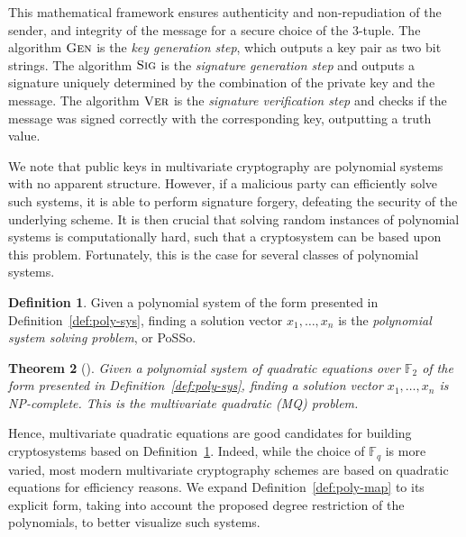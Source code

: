 \documentclass[12pt, a4paper, oneside]{memoir}
\newtheorem{theorem}{Theorem}[section]
\theoremstyle{definition}
\newtheorem{definition}[theorem]{Definition}
\begin{document}
This mathematical framework ensures authenticity and non-repudiation of the sender, and integrity of the message for a secure choice of the $3$-tuple. The algorithm $\textsc{Gen}$ is the \emph{key generation step}, which outputs a key pair as two bit strings. The algorithm $\textsc{Sig}$ is the \emph{signature generation step} and outputs a signature uniquely determined by the combination of the private key and the message. The algorithm $\textsc{Ver}$ is the \emph{signature verification step} and checks if the message was signed correctly with the corresponding key, outputting a truth value.

We note that public keys in multivariate cryptography are polynomial systems with no apparent structure. However, if a malicious party can efficiently solve such systems, it is able to perform signature forgery, defeating the security of the underlying scheme. It is then crucial that solving random instances of polynomial systems is computationally hard, such that a cryptosystem can be based upon this problem. Fortunately, this is the case for several classes of polynomial systems.

\begin{definition}\label{def:posso}
  Given a polynomial system of the form presented in Definition~\ref{def:poly-sys}, finding a solution vector $x_{1}, \dots, x_{n}$ is the \emph{polynomial system solving problem}, or \textsf{PoSSo}.
\end{definition}

\begin{theorem}[{\cite[Appendix A]{Patarin:199711}}]
  Given a polynomial system of \emph{quadratic equations over $\mathbb{F}_{2}$} of the form presented in Definition~\ref{def:poly-sys}, finding a solution vector $x_{1}, \dots, x_{n}$ is NP-complete. This is the \emph{multivariate quadratic (MQ) problem}.
\end{theorem}

Hence, multivariate quadratic equations are good candidates for building cryptosystems based on Definition~\ref{def:posso}. Indeed, while the choice of $\mathbb{F}_{q}$ is more varied, most modern multivariate cryptography schemes are based on quadratic equations for efficiency reasons. We expand Definition~\ref{def:poly-map} to its explicit form, taking into account the proposed degree restriction of the polynomials, to better visualize such systems.
\end{document}

